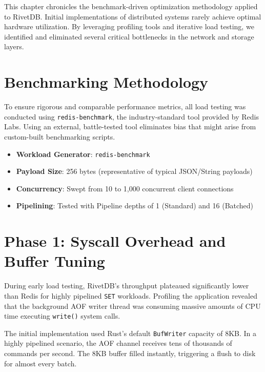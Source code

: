 
This chapter chronicles the benchmark-driven optimization methodology applied to RivetDB. Initial implementations of distributed systems rarely achieve optimal hardware utilization. By leveraging profiling tools and iterative load testing, we identified and eliminated several critical bottlenecks in the network and storage layers.

\section{Benchmarking Methodology}

To ensure rigorous and comparable performance metrics, all load testing was conducted using \texttt{redis-benchmark}, the industry-standard tool provided by Redis Labs. Using an external, battle-tested tool eliminates bias that might arise from custom-built benchmarking scripts.

\begin{itemize}[leftmargin=2.5em]
    \item \textbf{Workload Generator}: \texttt{redis-benchmark}
    \item \textbf{Payload Size}: 256 bytes (representative of typical JSON/String payloads)
    \item \textbf{Concurrency}: Swept from 10 to 1,000 concurrent client connections
    \item \textbf{Pipelining}: Tested with Pipeline depths of 1 (Standard) and 16 (Batched)
\end{itemize}

\section{Phase 1: Syscall Overhead and Buffer Tuning}

During early load testing, RivetDB's throughput plateaued significantly lower than Redis for highly pipelined \texttt{SET} workloads. Profiling the application revealed that the background AOF writer thread was consuming massive amounts of CPU time executing \texttt{write()} system calls.

The initial implementation used Rust's default \texttt{BufWriter} capacity of 8KB. In a highly pipelined scenario, the AOF channel receives tens of thousands of commands per second. The 8KB buffer filled instantly, triggering a flush to disk for almost every batch.

